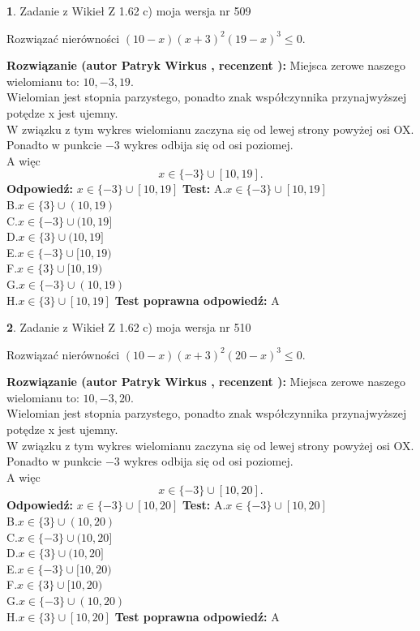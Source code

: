 \documentclass[12pt, a4paper]{article}
\theoremstyle{definition} %
\newtheorem{zad}{}
\newcommand{\zadStart}[1]{\begin{zad}#1\newline}
\newcommand{\zadStop}{\end{zad}}
\newcommand{\rozwStart}[2]{\noindent \textbf{Rozwiązanie (autor #1 , recenzent #2): }\newline}
\newcommand{\rozwStop}{\newline}
\newcommand{\odpStart}{\noindent \textbf{Odpowiedź:}\newline}
\newcommand{\odpStop}{\newline}
\newcommand{\testStart}{\noindent \textbf{Test:}\newline}
\newcommand{\testStop}{\newline}
\newcommand{\kluczStart}{\noindent \textbf{Test poprawna odpowiedź:}\newline}
\newcommand{\kluczStop}{\newline}
\begin{document}
\zadStart{Zadanie z Wikieł Z 1.62 c) moja wersja nr 509}

Rozwiązać nierówności $(10-x)(x+3)^{2}(19-x)^{3}\le0$.
\zadStop
\rozwStart{Patryk Wirkus}{}
Miejsca zerowe naszego wielomianu to: $10, -3, 19$.\\
Wielomian jest stopnia parzystego, ponadto znak współczynnika przy\linebreak najwyższej potędze x jest ujemny.\\ W związku z tym wykres wielomianu zaczyna się od lewej strony powyżej osi OX.\\
Ponadto w punkcie $-3$ wykres odbija się od osi poziomej.\\
A więc $$x \in \{-3\} \cup [10,19].$$
\rozwStop
\odpStart
$x \in \{-3\} \cup [10,19]$
\odpStop
\testStart
A.$x \in \{-3\} \cup [10,19]$\\
B.$x \in \{3\} \cup (10,19)$\\
C.$x \in \{-3\} \cup (10,19]$\\
D.$x \in \{3\} \cup (10,19]$\\
E.$x \in \{-3\} \cup [10,19)$\\
F.$x \in \{3\} \cup [10,19)$\\
G.$x \in \{-3\} \cup (10,19)$\\
H.$x \in \{3\} \cup [10,19]$
\testStop
\kluczStart
A
\kluczStop



\zadStart{Zadanie z Wikieł Z 1.62 c) moja wersja nr 510}

Rozwiązać nierówności $(10-x)(x+3)^{2}(20-x)^{3}\le0$.
\zadStop
\rozwStart{Patryk Wirkus}{}
Miejsca zerowe naszego wielomianu to: $10, -3, 20$.\\
Wielomian jest stopnia parzystego, ponadto znak współczynnika przy\linebreak najwyższej potędze x jest ujemny.\\ W związku z tym wykres wielomianu zaczyna się od lewej strony powyżej osi OX.\\
Ponadto w punkcie $-3$ wykres odbija się od osi poziomej.\\
A więc $$x \in \{-3\} \cup [10,20].$$
\rozwStop
\odpStart
$x \in \{-3\} \cup [10,20]$
\odpStop
\testStart
A.$x \in \{-3\} \cup [10,20]$\\
B.$x \in \{3\} \cup (10,20)$\\
C.$x \in \{-3\} \cup (10,20]$\\
D.$x \in \{3\} \cup (10,20]$\\
E.$x \in \{-3\} \cup [10,20)$\\
F.$x \in \{3\} \cup [10,20)$\\
G.$x \in \{-3\} \cup (10,20)$\\
H.$x \in \{3\} \cup [10,20]$
\testStop
\kluczStart
A
\kluczStop
\end{document}
